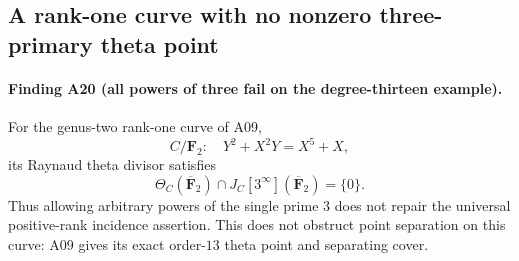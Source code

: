 \subsection{A rank-one curve with no nonzero three-primary theta point}
\label{sec:no-three-primary-theta}

\paragraph{Finding A20 (all powers of three fail on the degree-thirteen example).}
For the genus-two rank-one curve of A09,
\[
 C/\mathbf F_2:\quad Y^2+X^2Y=X^5+X,
\]
its Raynaud theta divisor satisfies
\[
       \Theta_C(\overline{\mathbf F}_2)
          \cap J_C[3^\infty](\overline{\mathbf F}_2)=\{0\}.
 \tag{TP.1}
\]
Thus allowing arbitrary powers of the single prime $3$ does not
repair the universal positive-rank incidence assertion. This does
not obstruct point separation on this curve: A09 gives its exact
order-$13$ theta point and separating cover.

